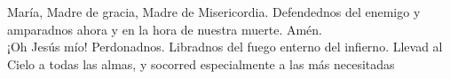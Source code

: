 \documentclass[../devocionario.tex]{subfiles}
\begin{document}
    \begin{center}
        María, Madre de gracia, Madre de Misericordia. Defendednos del enemigo y amparadnos ahora y en la hora de nuestra muerte. Amén. \\
        ¡Oh Jesús mío! Perdonadnos. Libradnos del fuego enterno del infierno. Llevad al Cielo a todas las almas, y socorred especialmente a las más necesitadas
    \end{center}
\end{document}
